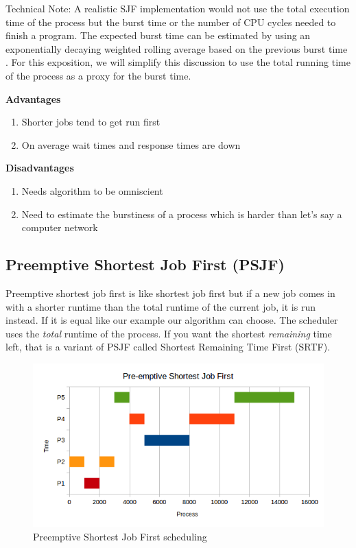 Technical Note: A realistic SJF implementation would not use the total execution time of the process but the burst time or the number of CPU cycles needed to finish a program.
The expected burst time can be estimated by using an exponentially decaying weighted rolling average based on the previous burst time \cite[Chapter 6]{silberschatz2005operating}.
For this exposition, we will simplify this discussion to use the total running time of the process as a proxy for the burst time.

\textbf{Advantages}

\begin{enumerate}
  \item Shorter jobs tend to get run first
  \item On average wait times and response times are down
\end{enumerate}

\textbf{Disadvantages}
\begin{enumerate}
  \item Needs algorithm to be omniscient
  \item Need to estimate the burstiness of a process which is harder than let's say a computer network
\end{enumerate}

\subsection{Preemptive Shortest Job First (PSJF)}

Preemptive shortest job first is like shortest job first but if a new job comes in with a shorter runtime than the total runtime of the current job, it is run instead.
If it is equal like our example our algorithm can choose.
The scheduler uses the \emph{total} runtime of the process.
If you want the shortest \emph{remaining} time left, that is a variant of PSJF called Shortest Remaining Time First (SRTF).

\begin{figure}[htbp]
\centering
\includegraphics[width=\textwidth]{scheduling/images/psjf.png}
\caption{Preemptive Shortest Job First scheduling}
\end{figure}

